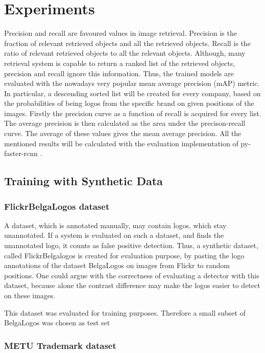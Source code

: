 \chapter{Experiments}

Precision and recall are favoured values in image retrieval. Precision is the fraction of relevant retrieved objects and all the retrieved objects. Recall is the ratio of relevant retrieved objects to all the relevant objects. Although, many retrieval system is capable to return a ranked list of the retrieved objects, precision and recall ignore this information. Thus, the trained models are evaluated with the nowadays very popular mean average precision (mAP) metric. In particular, a descending sorted list will be created for every company, based on the probabilities of being logos from the specific brand on given positions of the images. Firstly the precision curve as a function of recall is acquired for every list. The average precision is then calculated as the area under the precison-recall curve. The average of these values gives the mean average precision.
All the mentioned results will be calculated with the evaluation implementation of py-faster-rcnn \cite{Girshick2017} \cite{NIPS2015_5638}.

\section{Training with Synthetic Data}

\subsection{FlickrBelgaLogos dataset}

A dataset, which is annotated manually, may contain logos, which stay unannotated. If a system is evaluated on such a dataset, and finds the unannotated logo, it counts as false positive detection. Thus, a synthetic dataset, called FlickrBelgalogos \cite{letessier2012scalable} is created for evaluation purpose, by pasting the logo annotations of the dataset BelgaLogos \cite{belgalogos09} on images from Flickr to random positions. One could argue with the correctness of evaluating a detector with this dataset, because alone the contrast difference may make the logos easier to detect on these images.

This dataset was evaluated for training purposes. Therefore a small subset of BelgaLogos was chosen as test set

\subsection{METU Trademark dataset}

